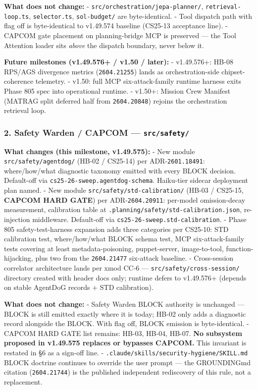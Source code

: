 \documentclass[11pt,letterpaper]{article}
\newcommand{\arxivid}[1]{\texttt{\textcolor{accent}{#1}}}
\begin{document}
\textbf{What does not change:} -
\texttt{src/orchestration/jepa-planner/}, \texttt{retrieval-loop.ts},
\texttt{selector.ts}, \texttt{sol-budget/} are byte-identical. - Tool
dispatch path with flag off is byte-identical to v1.49.574 baseline
(CS25-13 acceptance line). - CAPCOM gate placement on planning-bridge
MCP is preserved --- the Tool Attention loader sits \emph{above} the
dispatch boundary, never below it.

\textbf{Future milestones (v1.49.576+ / v1.50 / later):} - v1.49.576+:
HB-08 RPS/AGS divergence metrics (\arxivid{2604.21255}) lands as
orchestration-side chipset-coherence telemetry. - v1.50: full MCP
six-attack-family runtime harness exits Phase 805 spec into operational
runtime. - v1.50+: Mission Crew Manifest (MATRAG split deferred half
from \arxivid{2604.20848}) rejoins the orchestration retrieval loop.

\subsubsection{\texorpdfstring{2. Safety Warden / CAPCOM ---
\texttt{src/safety/}}{2. Safety Warden / CAPCOM --- src/safety/}}

\textbf{What changes (this milestone, v1.49.575):} - New module
\texttt{src/safety/agentdog/} (HB-02 / CS25-14) per ADR-\arxivid{2601.18491}:
where/how/what diagnostic taxonomy emitted with every BLOCK decision.
Default-off via \texttt{cs25-26-sweep.agentdog-schema}. Haiku-tier
sidecar deployment plan named. - New module
\texttt{src/safety/std-calibration/} (HB-03 / CS25-15, \textbf{CAPCOM
HARD GATE}) per ADR-\arxivid{2604.20911}: per-model omission-decay measurement,
calibration table at \texttt{.planning/safety/std-calibration.json},
re-injection middleware. Default-off via
\texttt{cs25-26-sweep.std-calibration}. - Phase 805 safety-test-harness
expansion adds three categories per CS25-10: STD calibration test,
where/how/what BLOCK schema test, MCP six-attack-family tests covering
at least metadata-poisoning, puppet-server, image-to-tool,
function-hijacking, plus two from the \arxivid{2604.21477} six-attack
baseline. - Cross-session correlator architecture lands per xmod CC-6
--- \texttt{src/safety/cross-session/} directory created with header
docs only; runtime defers to v1.49.576+ (depends on stable AgentDoG
records + STD calibration).

\textbf{What does not change:} - Safety Warden BLOCK authority is
unchanged --- BLOCK is still emitted exactly where it is today; HB-02
only adds a diagnostic record alongside the BLOCK. With flag off, BLOCK
emission is byte-identical. - CAPCOM HARD GATE list remains: HB-03,
HB-04, HB-07. \textbf{No subsystem proposed in v1.49.575 replaces or
bypasses CAPCOM.} This invariant is restated in §6 as a sign-off line. -
\texttt{.claude/skills/security-hygiene/SKILL.md} BLOCK doctrine
continues to override the user prompt --- the GROUNDINGmd citation
(\arxivid{2604.21744}) is the published independent rediscovery of this
rule, not a replacement.
\end{document}

